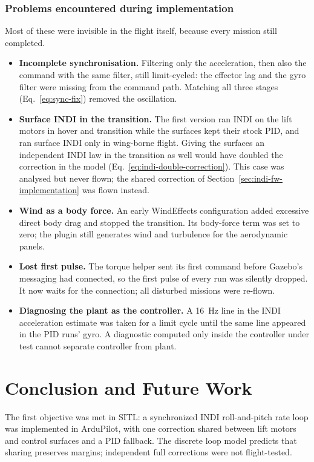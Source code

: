 \documentclass{article}
\begin{document}
\subsubsection{Problems encountered during implementation}
\label{sec:filtering-problem}
Most of these were invisible in the flight itself, because every mission still completed.
\begin{itemize}
    \item \textbf{Incomplete synchronisation.} Filtering only the acceleration, then also the command with the same filter, still limit-cycled: the effector lag and the gyro filter were missing from the command path. Matching all three stages (Eq.~\eqref{eq:sync-fix}) removed the oscillation.
    \item \textbf{Surface INDI in the transition.} The first version ran INDI on the lift motors in hover and transition while the surfaces kept their stock PID, and ran surface INDI only in wing-borne flight. Giving the surfaces an independent INDI law in the transition as well would have doubled the correction in the model (Eq.~\eqref{eq:indi-double-correction}). This case was analysed but never flown; the shared correction of Section~\ref{sec:indi-fw-implementation} was flown instead.
    \item \textbf{Wind as a body force.} An early WindEffects configuration added excessive direct body drag and stopped the transition. Its body-force term was set to zero; the plugin still generates wind and turbulence for the aerodynamic panels.
    \item \textbf{Lost first pulse.} The torque helper sent its first command before Gazebo's messaging had connected, so the first pulse of every run was silently dropped. It now waits for the connection; all disturbed missions were re-flown.
    \item \textbf{Diagnosing the plant as the controller.} A \SI{16}{\hertz} line in the INDI acceleration estimate was taken for a limit cycle until the same line appeared in the PID runs' gyro. A diagnostic computed only inside the controller under test cannot separate controller from plant.
\end{itemize}

\section{Conclusion and Future Work}
\label{sec:conclusion}
The first objective was met in SITL: a synchronized INDI roll-and-pitch rate loop was implemented in ArduPilot, with one correction shared between lift motors and control surfaces and a PID fallback. The discrete loop model predicts that sharing preserves margins; independent full corrections were not flight-tested.
\end{document}
